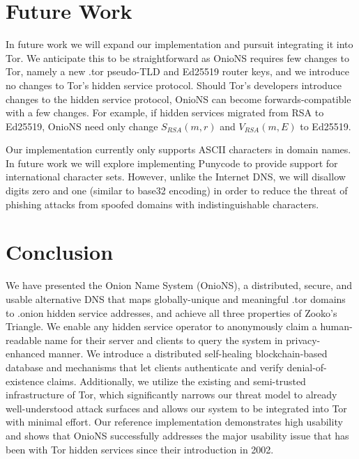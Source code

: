 \documentclass{sig-alternate}
\begin{document}
\section{Future Work}

In future work we will expand our implementation and pursuit integrating it into Tor. We anticipate this to be straightforward as OnioNS requires few changes to Tor, namely a new .tor pseudo-TLD and Ed25519 router keys, and we introduce no changes to Tor's hidden service protocol. Should Tor's developers introduce changes to the hidden service protocol, OnioNS can become forwards-compatible with a few changes. For example, if hidden services migrated from RSA to Ed25519, OnioNS need only change $ S_{\mathit{RSA}}(m, r) $ and $ V_{\mathit{RSA}}(m, E) $ to Ed25519.


Our implementation currently only supports ASCII characters in domain names. In future work we will explore implementing Punycode to provide support for international character sets. However, unlike the Internet DNS, we will disallow digits zero and one (similar to base32 encoding) in order to reduce the threat of phishing attacks from spoofed domains with indistinguishable characters.

\section{Conclusion}

We have presented the Onion Name System (OnioNS), a distributed, secure, and usable alternative DNS that maps globally-unique and meaningful .tor domains to .onion hidden service addresses, and achieve all three properties of Zooko's Triangle. We enable any hidden service operator to anonymously claim a human-readable name for their server and clients to query the system in privacy-enhanced manner. We introduce a distributed self-healing blockchain-based database and mechanisms that let clients authenticate and verify denial-of-existence claims. Additionally, we utilize the existing and semi-trusted infrastructure of Tor, which significantly narrows our threat model to already well-understood attack surfaces and allows our system to be integrated into Tor with minimal effort. Our reference implementation demonstrates high usability and shows that OnioNS successfully addresses the major usability issue that has been with Tor hidden services since their introduction in 2002.
\end{document}
